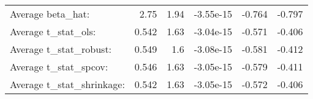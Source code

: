 \begin{tabular}{lrrrrr}
\hline
                           &       &      &           &        &        \\
\hline
 Average beta\_hat:         & 2.75  & 1.94 & -3.55e-15 & -0.764 & -0.797 \\
 Average t\_stat\_ols:       & 0.542 & 1.63 & -3.04e-15 & -0.571 & -0.406 \\
 Average t\_stat\_robust:    & 0.549 & 1.6  & -3.08e-15 & -0.581 & -0.412 \\
 Average t\_stat\_spcov:     & 0.546 & 1.63 & -3.05e-15 & -0.579 & -0.411 \\
 Average t\_stat\_shrinkage: & 0.542 & 1.63 & -3.05e-15 & -0.572 & -0.406 \\
\hline
\end{tabular}